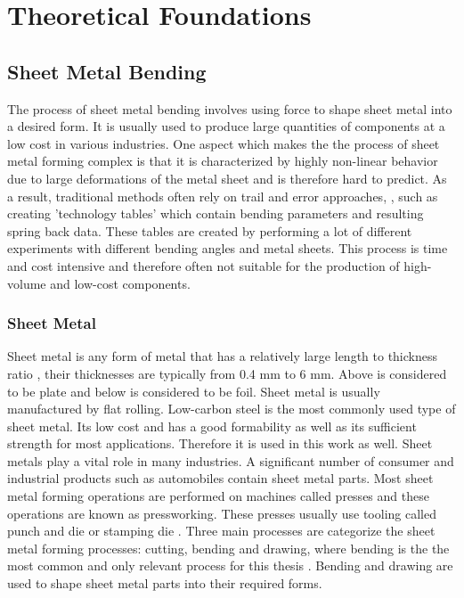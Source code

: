 \chapter{Theoretical Foundations}\label{ch:theoretical-foundations}


\section{Sheet Metal Bending}\label{sec:sheet-metal-bending}
The process of sheet metal bending involves using force to shape sheet metal into a
desired form.
It is usually used to produce large quantities of components at a low cost in various
industries.
\cite[p. 1]{dib_singleensembleclassifiers_2020}
One aspect which makes the the process of sheet metal forming complex is that it is
characterized
by highly non-linear behavior due to large deformations of the metal sheet and is
therefore hard
to predict.
As a result, traditional methods often rely on trail and error approaches, \cite[p.
1]{dib_singleensembleclassifiers_2020}, such as creating 'technology tables' which contain
bending parameters and resulting spring back data. These tables are created by
performing a lot
of different experiments with different bending angles and metal sheets.
This process is time and cost intensive and therefore often not suitable for the
production of
high-volume and low-cost components.

\subsection{Sheet Metal}\label{subsec:sheet-metal}
Sheet metal is any form of metal that has a relatively large length to thickness ratio
, their
thicknesses are typically from 0.4 mm to 6 mm. Above is considered to be plate and
below is
considered to be foil. Sheet metal is usually manufactured by flat rolling.
Low-carbon steel is the most commonly used type of sheet metal. Its low cost and has a
good
formability as well as its sufficient strength for most applications.
\cite[p. 405]{groover_fundamentalsmodernmanufacturing_2020}
Therefore it is used in this work as well.
Sheet metals play a vital role in many industries. A significant number of consumer and
industrial products such as automobiles contain sheet metal parts.
Most sheet metal forming operations are performed on machines called presses and these
operations
are known as pressworking. These presses usually use tooling called punch and die or
stamping die
. Three main processes are categorize the sheet metal forming processes: cutting,
bending and
drawing, where bending is the the most common and only relevant process for this thesis
. Bending
and drawing are used to shape sheet metal parts into their required forms.
\cite[p. 405]{groover_fundamentalsmodernmanufacturing_2020}

